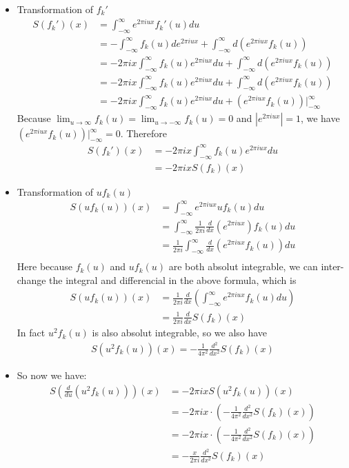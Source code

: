 \documentclass[pdf]{article}
\begin{document}
\begin{itemize}
\item Transformation of $f_k'$
\begin{align*}
S(f_k')(x) &= \int_{-\infty}^\infty e^{2\pi iux} f_k'(u)du\\
                &= -\int_{-\infty}^\infty  f_k(u)de^{2\pi iux} + \int_{-\infty}^\infty d(e^{2\pi iux} f_k(u))\\
                &= -2\pi ix\int_{-\infty}^\infty  f_k(u)e^{2\pi iux} du+ \int_{-\infty}^\infty d(e^{2\pi iux} f_k(u))\\
                &= -2\pi ix\int_{-\infty}^\infty  f_k(u)e^{2\pi iux} du+ \int_{-\infty}^\infty d(e^{2\pi iux} f_k(u))\\
                &= -2\pi ix\int_{-\infty}^\infty  f_k(u)e^{2\pi iux} du+  (e^{2\pi iux} f_k(u))|_{-\infty}^\infty
\end{align*}
Because $\lim_{u\to \infty}f_k(u) = \lim_{u\to -\infty}f_k(u) = 0$ and $|e^{2\pi iux}| = 1$, we have $(e^{2\pi iux} f_k(u))|_{-\infty}^\infty = 0$. Therefore
\begin{align*}
S(f_k')(x) &= -2\pi ix\int_{-\infty}^\infty  f_k(u)e^{2\pi iux} du\\
                &= -2\pi ixS(f_k)(x)
\end{align*}
\item Transformation  of $uf_k(u)$
\begin{align*}
S(uf_k(u))(x) &= \int_{-\infty}^\infty e^{2\pi iux} uf_k(u)du\\
                      &= \int_{-\infty}^\infty \frac{1}{2\pi i}\frac{d}{dx}(e^{2\pi iux}) f_k(u)du\\
                      &= \frac{1}{2\pi i}\int_{-\infty}^\infty \frac{d}{dx}(e^{2\pi iux} f_k(u))du\\
\end{align*}
Here because $f_k(u)$ and $uf_k(u)$ are both absolut integrable, we can inter-change the integral and differencial in the above formula, which is
\begin{align*}
S(uf_k(u))(x) &= \frac{1}{2\pi i}\frac{d}{dx} \left( \int_{-\infty}^\infty e^{2\pi iux} f_k(u)du\right)\\
                      &= \frac{1}{2\pi i}\frac{d}{dx} S(f_k)(x)
\end{align*}
In fact $u^2f_k(u)$ is also absolut integrable, so we also have
\begin{align*}
S(u^2f_k(u))(x) = -\frac{1}{4\pi^2}\frac{d^2}{dx^2} S(f_k)(x)
\end{align*}
\item So now we have:
\begin{align*}
S(\frac{d}{du}(u^2f_k(u)))(x) &= -2\pi ix S(u^2f_k(u))(x)\\
                                                  &= -2\pi ix\cdot\left(-\frac{1}{4\pi^2}\frac{d^2}{dx^2} S(f_k)(x)\right)\\
                                                  &= -2\pi ix\cdot\left(-\frac{1}{4\pi^2}\frac{d^2}{dx^2} S(f_k)(x)\right)\\
                                                  &= -\frac{x}{2\pi i}\frac{d^2}{dx^2} S(f_k)(x)
\end{align*}
\end{itemize}
\end{document}
